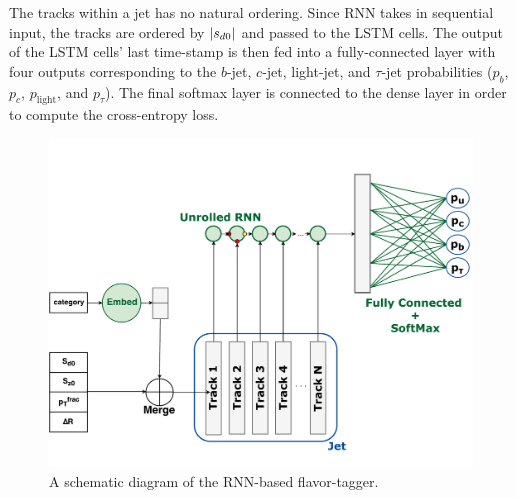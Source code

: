The tracks within a jet has no natural ordering. Since RNN takes in sequential input, the tracks are ordered by $|s_{d0}|$ and passed to the LSTM cells. The output of the LSTM cells' last time-stamp is then fed into a fully-connected layer with four outputs corresponding to the $b$-jet, $c$-jet, light-jet, and $\tau$-jet probabilities ($p_b$, $p_c$, $p_{\textrm{light}}$, and $p_\tau$). The final softmax layer is connected to the dense layer in order to compute the cross-entropy loss. 


\begin{figure}[htbp]
  \centering
  \includegraphics[width=\textwidth]{figures/RNN/RNNIP.pdf}
\caption{A schematic diagram of the RNN-based flavor-tagger.}
  \label{fig:rnn}
\end{figure}

